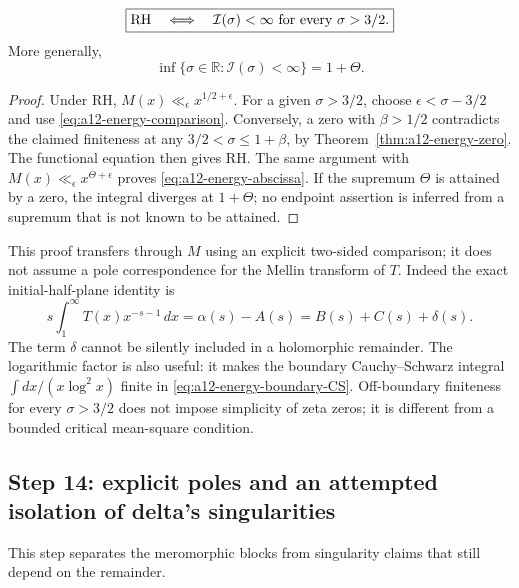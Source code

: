 \begin{corollary}
\label{cor:a12-energy-RH}
\begin{equation}
\label{eq:a12-energy-RH}
\boxed{\mathrm{RH}\quad\Longleftrightarrow\quad
\mathcal I(\sigma)<\infty\ \hbox{for every }\sigma>3/2.}
\end{equation}
More generally,
\begin{equation}
\label{eq:a12-energy-abscissa}
\inf\{\sigma\in\mathbb R:\mathcal I(\sigma)<\infty\}=1+\Theta.
\end{equation}
\end{corollary}
\begin{proof}
Under RH, $M(x)\ll_\epsilon x^{1/2+\epsilon}$. For a given $\sigma>3/2$,
choose $\epsilon<\sigma-3/2$ and use
\eqref{eq:a12-energy-comparison}. Conversely, a zero with $\beta>1/2$
contradicts the claimed finiteness at any
$3/2<\sigma\le1+\beta$, by Theorem~\ref{thm:a12-energy-zero}.
The functional equation then gives RH. The same argument with
$M(x)\ll_\epsilon x^{\Theta+\epsilon}$ proves
\eqref{eq:a12-energy-abscissa}. If the supremum $\Theta$ is attained by a
zero, the integral diverges at $1+\Theta$; no endpoint assertion is
inferred from a supremum that is not known to be attained.
\end{proof}

This proof transfers through $M$ using an explicit two-sided comparison;
it does not assume a pole correspondence for the Mellin transform of $T$.
Indeed the exact initial-half-plane identity is
\begin{equation}
\label{eq:a12-T-Mellin}
s\int_1^\infty T(x)x^{-s-1}\,dx
=\alpha(s)-A(s)=B(s)+C(s)+\delta(s).
\end{equation}
The term $\delta$ cannot be silently included in a holomorphic remainder.
The logarithmic factor is also useful:
it makes the boundary Cauchy--Schwarz integral
$\int dx/(x\log^2x)$ finite in
\eqref{eq:a12-energy-boundary-CS}.
Off-boundary finiteness for every $\sigma>3/2$ does not impose simplicity
of zeta zeros; it is different from a bounded critical mean-square
condition.

\subsection{Step 14: explicit poles and an attempted isolation of delta's singularities}
\label{subsec:a12-pole-attempt}
This step separates the meromorphic blocks from singularity claims that
still depend on the remainder.

